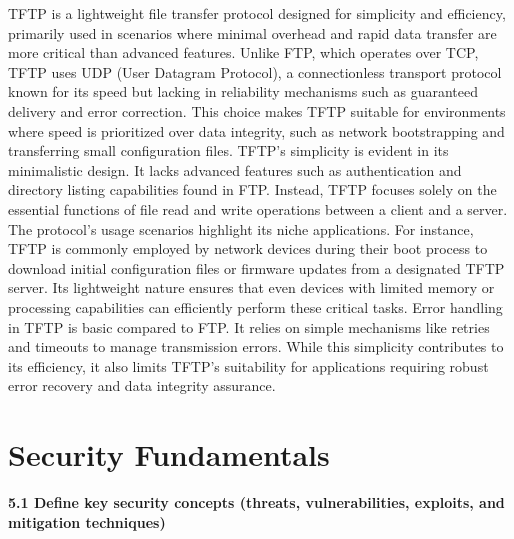 \documentclass{article}
\begin{document}
	TFTP is a lightweight file transfer protocol designed for simplicity and efficiency, primarily used in scenarios where minimal overhead and rapid data transfer are more critical than advanced features. Unlike FTP, which operates over TCP, TFTP uses UDP (User Datagram Protocol), a connectionless transport protocol known for its speed but lacking in reliability mechanisms such as guaranteed delivery and error correction. This choice makes TFTP suitable for environments where speed is prioritized over data integrity, such as network bootstrapping and transferring small configuration files. TFTP's simplicity is evident in its minimalistic design. It lacks advanced features such as authentication and directory listing capabilities found in FTP. Instead, TFTP focuses solely on the essential functions of file read and write operations between a client and a server. The protocol's usage scenarios highlight its niche applications. For instance, TFTP is commonly employed by network devices during their boot process to download initial configuration files or firmware updates from a designated TFTP server. Its lightweight nature ensures that even devices with limited memory or processing capabilities can efficiently perform these critical tasks. Error handling in TFTP is basic compared to FTP. It relies on simple mechanisms like retries and timeouts to manage transmission errors. While this simplicity contributes to its efficiency, it also limits TFTP's suitability for applications requiring robust error recovery and data integrity assurance.\\

\section{Security Fundamentals}
\textbf{5.1 Define key security concepts (threats, vulnerabilities, exploits, and mitigation techniques)}\\
\end{document}
